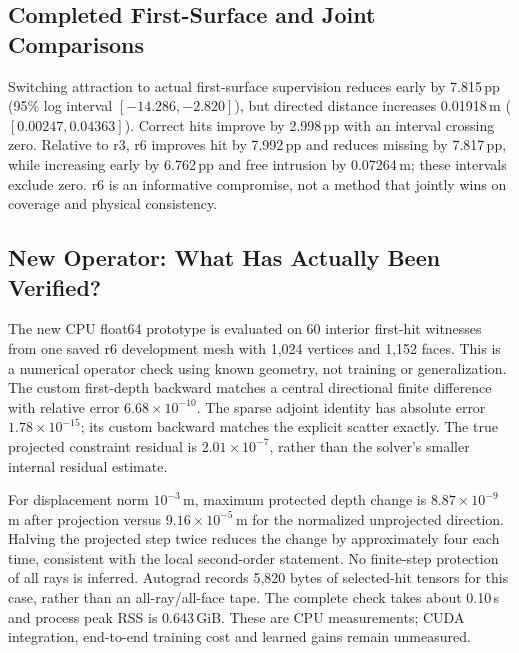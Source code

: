 \subsection{Completed First-Surface and Joint Comparisons}
\begin{table}[t]
 \centering\scriptsize
 \caption{r6 minus r4, five paired development logs. Early improves in every log; directed surface distance worsens in every log. Other intervals cross zero and do not establish preservation.}
 \label{tab:r6}
\end{table}
Switching attraction to actual first-surface supervision reduces early by 7.815\,pp (95\% log interval $[-14.286,-2.820]$), but directed distance increases 0.01918\,m ($[0.00247,0.04363]$). Correct hits improve by 2.998\,pp with an interval crossing zero. Relative to r3, r6 improves hit by 7.992\,pp and reduces missing by 7.817\,pp, while increasing early by 6.762\,pp and free intrusion by 0.07264\,m; these intervals exclude zero. r6 is an informative compromise, not a method that jointly wins on coverage and physical consistency.







\subsection{New Operator: What Has Actually Been Verified?}
The new CPU float64 prototype is evaluated on 60 interior first-hit witnesses from one saved r6 development mesh with 1,024 vertices and 1,152 faces. This is a numerical operator check using known geometry, not training or generalization. The custom first-depth backward matches a central directional finite difference with relative error $6.68\times10^{-10}$. The sparse adjoint identity has absolute error $1.78\times10^{-15}$; its custom backward matches the explicit scatter exactly. The true projected constraint residual is $2.01\times10^{-7}$, rather than the solver's smaller internal residual estimate.

For displacement norm $10^{-3}$\,m, maximum protected depth change is $8.87\times10^{-9}$\,m after projection versus $9.16\times10^{-5}$\,m for the normalized unprojected direction. Halving the projected step twice reduces the change by approximately four each time, consistent with the local second-order statement. No finite-step protection of all rays is inferred. Autograd records 5,820 bytes of selected-hit tensors for this case, rather than an all-ray/all-face tape. The complete check takes about 0.10\,s and process peak RSS is 0.643\,GiB. These are CPU measurements; CUDA integration, end-to-end training cost and learned gains remain unmeasured.

